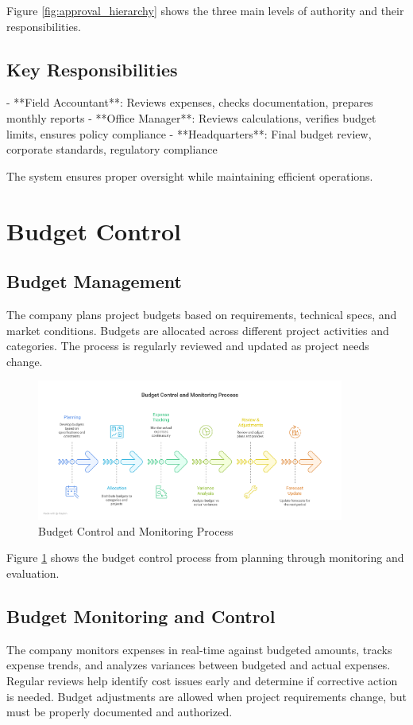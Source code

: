 Figure \ref{fig:approval_hierarchy} shows the three main levels of authority and their responsibilities.

\subsection{Key Responsibilities}
- **Field Accountant**: Reviews expenses, checks documentation, prepares monthly reports
- **Office Manager**: Reviews calculations, verifies budget limits, ensures policy compliance
- **Headquarters**: Final budget review, corporate standards, regulatory compliance

The system ensures proper oversight while maintaining efficient operations.

\vspace{0.5em}
\section{Budget Control}

\subsection{Budget Management}
The company plans project budgets based on requirements, technical specs, and market conditions. Budgets are allocated across different project activities and categories. The process is regularly reviewed and updated as project needs change.

\begin{figure}[H]
    \centering
    \includegraphics[width=0.9\textwidth]{assets/images/budget_control.png}
    \caption{Budget Control and Monitoring Process}
    \label{fig:budget_control}
\end{figure}

Figure \ref{fig:budget_control} shows the budget control process from planning through monitoring and evaluation.

\subsection{Budget Monitoring and Control}
The company monitors expenses in real-time against budgeted amounts, tracks expense trends, and analyzes variances between budgeted and actual expenses. Regular reviews help identify cost issues early and determine if corrective action is needed. Budget adjustments are allowed when project requirements change, but must be properly documented and authorized.
